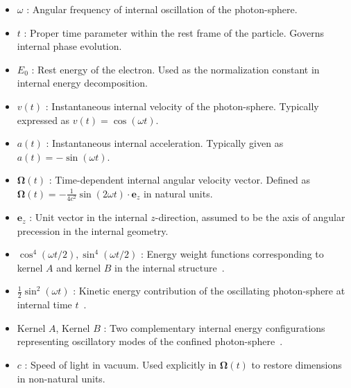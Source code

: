 \documentclass[%
 reprint,
 amsmath,amssymb,
 aps,
]{revtex4-1}
\numberwithin{equation}{section}%
\begin{document}
\begin{itemize}
    \item $\omega$ : Angular frequency of internal oscillation of the photon-sphere. 
    
    \item $t$ : Proper time parameter within the rest frame of the particle. Governs internal phase evolution.
    
    \item $E_0$ : Rest energy of the electron. Used as the normalization constant in internal energy decomposition.
    
    \item $v(t)$ : Instantaneous internal velocity of the photon-sphere. Typically expressed as $v(t) = \cos(\omega t)$.
    
    \item $a(t)$ : Instantaneous internal acceleration. Typically given as $a(t) = -\sin(\omega t)$.
    
    \item $\boldsymbol{\Omega}(t)$ : Time-dependent internal angular velocity vector. Defined as $\boldsymbol{\Omega}(t) = -\frac{1}{4c^2} \sin(2\omega t) \cdot \mathbf{e}_z$ in natural units.
    
    \item $\mathbf{e}_z$ : Unit vector in the internal $z$-direction, assumed to be the axis of angular precession in the internal geometry.
    
    \item $\cos^4(\omega t/2), \sin^4(\omega t/2)$ : Energy weight functions corresponding to kernel $A$ and kernel $B$ in the internal structure~\cite{hanamura2411.0117}.
    
    \item $\frac{1}{2} \sin^2(\omega t)$ : Kinetic energy contribution of the oscillating photon-sphere at internal time $t$~\cite{hanamura2411.0117}.
    
    \item Kernel $A$, Kernel $B$ : Two complementary internal energy configurations representing oscillatory modes of the confined photon-sphere~\cite{hanamura2411.0117}.
    
    \item $c$ : Speed of light in vacuum. Used explicitly in $\boldsymbol{\Omega}(t)$ to restore dimensions in non-natural units.
\end{itemize}
\end{document}
